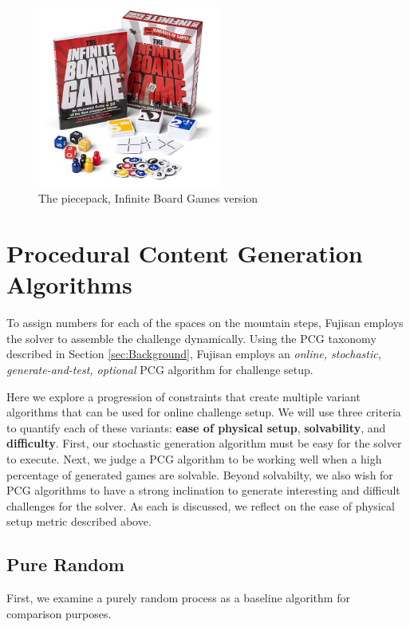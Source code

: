 \documentclass[10pt,journal,compsoc]{IEEEtran}
\begin{document}
\begin{figure}[t]
\centering
\includegraphics[width=6cm]{graphics/infinite.jpg}
\caption{The piecepack, Infinite Board Games version}
\label{fig:piecepackinfinite}
\end{figure}

\section{Procedural Content Generation Algorithms}

\noindent
To assign numbers for each of the spaces on the mountain steps, Fujisan employs the solver to assemble the challenge dynamically.
Using the PCG taxonomy described in Section \ref{sec:Background}, Fujisan employs an {\it online, stochastic, generate-and-test, optional} PCG algorithm for challenge setup. 

Here we explore a progression of constraints that create multiple variant algorithms that can be used for online challenge setup. 
We will use three criteria to quantify each of these variants:
{\bf ease of physical setup}, {\bf solvability}, and {\bf difficulty}.  First, our stochastic 
generation algorithm must be easy for the solver
 to execute.
Next, we judge a PCG algorithm to be working well when a high 
percentage of generated games are solvable. Beyond solvabilty, we also wish for PCG algorithms to have a strong inclination to generate interesting and difficult challenges for the solver. 
As each is discussed, we reflect on the ease of physical setup metric described above.

\subsection{Pure Random}

First, we examine a purely random process as a baseline algorithm for comparison purposes.
\end{document}
